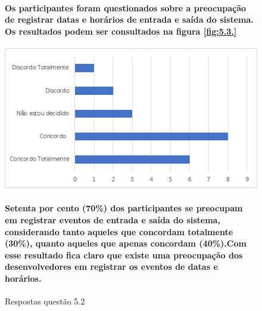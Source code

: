 \begin{figure}[!t]
\centering
\paragraph{Os participantes foram questionados sobre a preocupação de registrar datas e horários de entrada e saída do sistema. Os resultados podem ser consultados na figura \ref{fig:5.3.}}
\includegraphics[scale=0.7]{figuras das questoes/5.2.png}
\caption{Respostas questão 5.2}
\paragraph{Setenta por cento (70{\%}) dos participantes se preocupam em registrar eventos de entrada e saída do sistema, considerando tanto aqueles que concordam totalmente (30{\%}), quanto aqueles que apenas concordam (40{\%}).Com esse resultado fica claro que existe uma preocupação dos desenvolvedores em registrar os eventos de datas e horários.}
\label{fig:5.3}
\end{figure}


